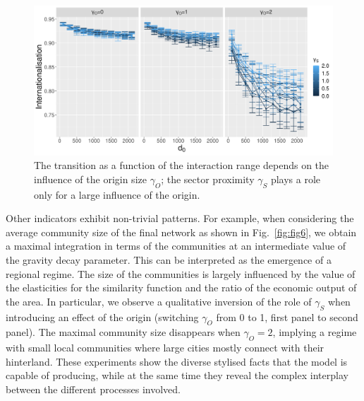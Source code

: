 \documentclass[10pt,letterpaper]{article}
\begin{document}
\begin{figure}
    \includegraphics[width=\linewidth]{figures/Fig5.png}
    \vspace{2cm}
    \caption{The transition as a function of the interaction range depends on the influence of the origin size $\gamma_O$; the sector proximity $\gamma_S$ plays a role only for a large influence of the origin.\label{fig:fig5}}
\end{figure}

Other indicators exhibit non-trivial patterns. For example, when considering the average community size of the final network as shown in Fig.~\ref{fig:fig6}, we obtain a maximal integration in terms of the communities at an intermediate value of the gravity decay parameter. This can be interpreted as the emergence of a regional regime. The size of the communities is largely influenced by the value of the elasticities for the similarity function and the ratio of the economic output of the area. In particular, we observe a qualitative inversion of the role of $\gamma_S$ when introducing an effect of the origin (switching $\gamma_O$ from 0 to 1, first panel to second panel). The maximal community size disappears when $\gamma_O = 2$, implying a regime with small local communities where large cities mostly connect with their hinterland. These experiments show the diverse stylised facts that the model is capable of producing, while at the same time they reveal the complex interplay between the different processes involved.
\end{document}
